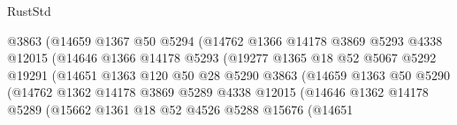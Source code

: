 \begin{lexlean}{RustStd}
\begin{coremodule}
                                  @3863
                                  (@14659
                                    @1367
                                    @50
                                    @5294
                                    (@14762
                                      @1366
                                      @14178
                                      @3869
                                      @5293
                                      @4338
                                      @12015
                                      (@14646
                                        @1366
                                        @14178
                                        @5293
                                        (@19277
                                          @1365
                                          @18
                                          @52
                                          @5067
                                          @5292
                                          @19291
                                          (@14651
                                            @1363
                                            @120
                                            @50
                                            @28
                                            @5290
                                            @3863
                                            (@14659
                                              @1363
                                              @50
                                              @5290
                                              (@14762
                                                @1362
                                                @14178
                                                @3869
                                                @5289
                                                @4338
                                                @12015
                                                (@14646
                                                  @1362
                                                  @14178
                                                  @5289
                                                  (@15662
                                                    @1361
                                                    @18
                                                    @52
                                                    @4526
                                                    @5288
                                                    @15676
                                                    (@14651

\end{coremodule}
\end{lexlean}
